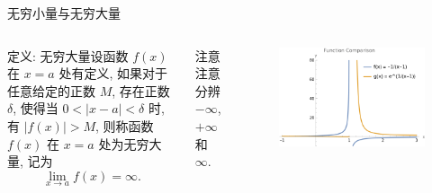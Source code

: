 \documentclass[
10pt,  
aspectratio=43,  
]{beamer}
\begin{document}
\begin{frame}[c]{无穷小量与无穷大量}
	
\begin{columns}[onlytextwidth]


\begin{block}{定义: 无穷大量}设函数 $f(x)$ 在 $x=a$ 处有定义,  如果对于任意给定的正数 $M$,  存在正数 $\delta$,  使得当 $0 < |x-a| < \delta$ 时,  有 $|f(x)| > M$,  则称函数 $f(x)$ 在 $x=a$ 处为无穷大量,  记为
\begin{equation*}
\lim_{x\to a}f(x) = \infty.
\end{equation*}
\end{block}
\begin{exampleblock}{注意}
注意分辨 $-\infty$,   $+\infty$ 和 $\infty$.
\end{exampleblock}
\begin{figure}
    \centering
    \includegraphics[width=0.8\linewidth]{infinity2.png}

\end{figure}
\end{columns}
\end{frame}	
\end{document}
